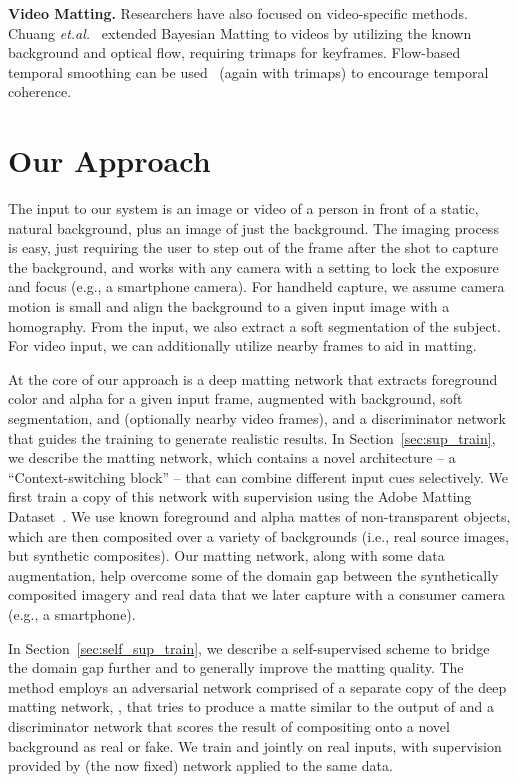 \documentclass[10pt,twocolumn,letterpaper]{article}
\begin{document}
\textbf{Video Matting.} Researchers have also focused on video-specific methods. Chuang \textit{et.al.}~\cite{chuang2002video} extended Bayesian Matting to videos by utilizing the known background and optical flow, requiring trimaps for  keyframes. Flow-based temporal smoothing can be used~\cite{lee2010temporally,shahrian2014temporally} (again with trimaps) to encourage temporal coherence. 





%
 

\vspace{-0.5em}
\section{Our Approach}
\label{sec:model}
The input to our system is an image or video of a person in front of a static, natural background, plus an image of just the background.  The imaging process is easy, just requiring the user to step out of the frame after the shot to capture the background, and works with any camera with a setting to lock the exposure and focus (e.g., a smartphone camera).  For handheld capture, we assume camera motion is small and align the background to a given input image with a homography.  From the input, we also extract a soft segmentation of the subject.  For video input, we can additionally utilize nearby frames to aid in matting.

At the core of our approach is a deep matting network  that extracts foreground color and alpha for a given input frame, augmented with background, soft segmentation, and (optionally nearby video frames), and a discriminator network  that guides the training to generate realistic results.  In Section~\ref{sec:sup_train}, we describe the matting network, which contains a novel architecture -- a ``Context-switching block'' -- that can combine different input cues selectively.  We first train a copy of this network  with supervision using the Adobe Matting Dataset~\cite{xu2017deep}. We use known foreground and alpha mattes of non-transparent objects, which are then composited over a variety of backgrounds (i.e., real source images, but synthetic composites).  Our matting network, along with some data augmentation, help overcome some of the domain gap between the synthetically composited imagery and real data that we later capture with a consumer camera (e.g., a smartphone).

In Section~\ref{sec:self_sup_train}, we describe a self-supervised scheme to bridge the domain gap further and to generally improve the matting quality.  The method employs an adversarial network comprised of a separate copy of the deep matting network, , that tries to produce a matte similar to the output of  and a discriminator network  that scores the result of compositing onto a novel background as real or fake.  We train  and  jointly on real inputs, with supervision provided by (the now fixed)  network applied to the same data.
\end{document}

